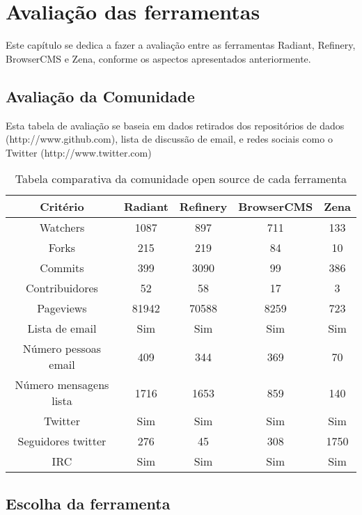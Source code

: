 \chapter{Avaliação das ferramentas}

Este capítulo se dedica a fazer a avaliação entre as ferramentas Radiant, Refinery, BrowserCMS e Zena, conforme os aspectos apresentados anteriormente.

\section{Avaliação da Comunidade}

Esta tabela de avaliação se baseia em dados retirados dos repositórios de dados (http://www.github.com), lista de discussão de email, e redes sociais como o Twitter (http://www.twitter.com)

\begin{table}[ht]
\caption{Tabela comparativa da comunidade open source de cada ferramenta } %
\centering %
\begin{tabular}{c c c c c} %
\hline\hline %
Critério & Radiant & Refinery & BrowserCMS & Zena \\ [0.5ex] %
\hline %
Watchers               & 1087  & 897   & 711 & 133 \\ %
Forks                  & 215   & 219   & 84 & 10  \\
Commits                & 399   & 3090  & 99 & 386  \\
Contribuidores         & 52    & 58    & 17     & 3  \\ 
Pageviews              & 81942 & 70588 & 8259 & 723  \\ 
Lista de email         & Sim   & Sim   & Sim & Sim  \\ 
Número pessoas email   & 409   & 344   & 369 & 70  \\ 
Número mensagens lista & 1716  & 1653  & 859 & 140  \\ 
Twitter                & Sim   & Sim   & Sim & Sim  \\ 
Seguidores twitter     & 276   & 45 & 308 & 1750  \\ 
IRC                    & Sim   & Sim & Sim & Sim  \\ [1ex] %
\hline %
\end{tabular}
\label{table:nonlin} %
\end{table}




\section{Escolha da ferramenta}

